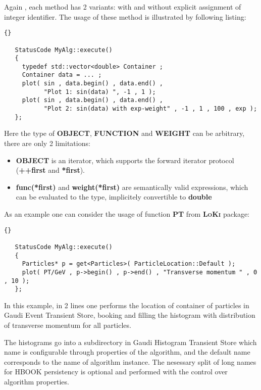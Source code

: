 \documentclass{lhcbnote}
\newcommand{\bftt}         {\ttfamily\bfseries}
\newcommand{\scbf}         {\scshape\bfseries}
\begin{document}
Again , each method has 2 variants: with and without explicit
assignment of integer identifier.
The usage of these method is illustrated by following listing:

\begin{scriptsize}
 \begin{lstlisting}{}

   StatusCode MyAlg::execute()
   {
     typedef std::vector<double> Container ;
     Container data = ... ;
     plot( sin , data.begin() , data.end() ,
           "Plot 1: sin(data) ", -1 , 1 );
     plot( sin , data.begin() , data.end() ,
           "Plot 2: sin(data) with exp-weight" , -1 , 1 , 100 , exp );
   };

 \end{lstlisting}
\end{scriptsize}

Here the type of {\bftt{OBJECT}}, {\bftt{FUNCTION}} and
{\bftt{WEIGHT}} can be arbitrary, there are only 2 limitations:
\begin{itemize}
\item {\bftt{OBJECT}} is an iterator, which supports the forward iterator protocol
({\bftt{++first}} and {\bftt{*first}}).
\item {\bftt{func(*first)}} and {\bftt{weight(*first)}} are semantically
  valid expressions, which can be evaluated to the type, implicitely
  convertible to {\bftt{double}}
\end{itemize}
As an example one can consider the usage of
function {\bftt{PT}} from {\scbf{LoKi}} package:

\begin{scriptsize}
 \begin{lstlisting}{}

   StatusCode MyAlg::execute()
   {
     Particles* p = get<Particles>( ParticleLocation::Default );
     plot( PT/GeV , p->begin() , p->end() , "Transverse momentum " , 0  , 10 );
   };

 \end{lstlisting}
\end{scriptsize}

In this example, in 2 lines one performs the location of
container of particles
in Gaudi Event Transient Store, booking and filling the histogram with
distribution of transverse momentum  for all particles.


The histograms go into a subdirectory in Gaudi Histogram Transient
Store which name is configurable through properties of the algorithm,
and the default name corresponds to the name of algorithm instance.
The nesessary split of long names for HBOOK persistency is
optional and performed with the control over algorithm properties.
\end{document}
